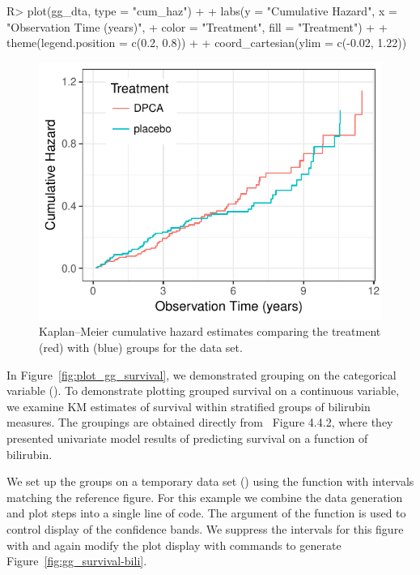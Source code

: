\documentclass[nojss]{jss}
\begin{document}
\begin{Schunk}
\begin{Sinput}
R> plot(gg_dta, type = "cum_haz") +
+   labs(y = "Cumulative Hazard", x = "Observation Time (years)",
+        color = "Treatment", fill = "Treatment") +
+   theme(legend.position = c(0.2, 0.8)) +
+   coord_cartesian(ylim = c(-0.02, 1.22))
\end{Sinput}
\begin{figure}[!htb]

{\centering \includegraphics[width=\maxwidth]{fig-rfs/rfs-plot_gg_cum_hazard-1} 

}

\caption[Kaplan--Meier cumulative hazard estimates comparing the  treatment (red) with  (blue) groups for the  data set]{Kaplan--Meier cumulative hazard estimates comparing the  treatment (red) with  (blue) groups for the  data set.}\label{fig:plot_gg_cum_hazard}
\end{figure}
\end{Schunk}

In Figure~\ref{fig:plot_gg_survival}, we demonstrated grouping on the categorical variable (). To demonstrate plotting grouped survival on a continuous variable, we examine KM estimates of survival within stratified groups of bilirubin measures. The groupings are obtained directly from~\cite{fleming:1991} Figure 4.4.2, where they presented univariate model results of predicting survival on a function of bilirubin.

We set up the  groups on a temporary data set () using the  function with intervals matching the reference figure. For this example we combine the data generation and plot steps into a single line of code. The  argument of the  function is used to control display of the confidence bands. We suppress the intervals for this figure with  and again modify the plot display with  commands to generate Figure~\ref{fig:gg_survival-bili}.
\end{document}

